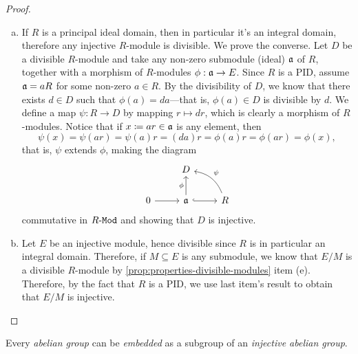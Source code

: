 \begin{proof}
    \begin{enumerate}[(a)]\setlength\itemsep{0em}
        \item If \(R\) is a principal ideal domain, then in particular it's an integral
              domain, therefore any injective \(R\)-module is divisible. We prove the
              converse. Let \(D\) be a divisible \(R\)-module and take any non-zero
              submodule (ideal) \(\mathfrak{a}\) of \(R\), together with a morphism of
              \(R\)-modules \(\phi: \mathfrak{a} \to E\). Since \(R\) is a PID, assume
              \(\mathfrak{a} = a R\) for some non-zero \(a \in R\). By the divisibility of
              \(D\), we know that there exists \(d \in D\) such that
              \(\phi(a) = d a\)---that is, \(\phi(a) \in D\) is divisible by \(d\). We
              define a map \(\psi: R \to D\) by mapping \(r \mapsto d r\), which is clearly
              a morphism of \(R\)-modules. Notice that if \(x \coloneq a r \in \mathfrak{a}\) is
              any element, then
              \[
                  \psi(x) = \psi(a r) = \psi(a) r = (d a) r = \phi(a) r = \phi(a r) = \phi(x),
              \]
              that is, \(\psi\) extends \(\phi\), making the diagram
              \[
                  \begin{tikzcd}
                      &D &
                      \\
                      0 \ar[r] &\ideal a \ar[u, "\phi"] \ar[r, hook]
                      &R \ar[lu, "\psi"', bend right]
                  \end{tikzcd}
              \]
              commutative in \({R\text{-}\texttt{Mod}}\) and showing that \(D\) is injective.

        \item Let \(E\) be an injective module, hence divisible since \(R\) is in
              particular an integral domain. Therefore, if \(M \subseteq E\) is any
              submodule, we know that \(E/M\) is a divisible \(R\)-module by
              \cref{prop:properties-divisible-modules} item (e). Therefore, by the fact that
              \(R\) is a PID, we use last item's result to obtain that \(E/M\) is
              injective.
    \end{enumerate}
\end{proof}

\begin{corollary}
    \label{cor:abelian-group-embedded-injective-abelian-group}
    Every \emph{abelian group} can be \emph{embedded} as a subgroup of an
    \emph{injective abelian group}.
\end{corollary}

